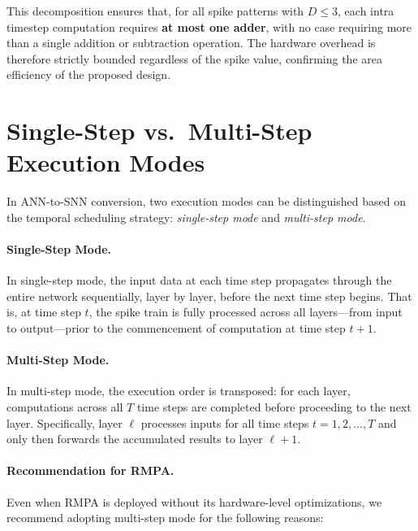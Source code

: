 This decomposition ensures that, for all spike patterns with $D \leq 3$, each intra timestep computation requires \textbf{at most one adder}, with no case requiring more than a single addition or subtraction operation. The hardware overhead is therefore strictly bounded regardless of the spike value, confirming the area efficiency of the proposed design.

\section{Single-Step vs.\ Multi-Step Execution Modes}

In ANN-to-SNN conversion, two execution modes can be distinguished based on the 
temporal scheduling strategy: \textit{single-step mode} and \textit{multi-step mode}.

\paragraph{Single-Step Mode.}
In single-step mode, the input data at each time step propagates through the entire 
network sequentially, layer by layer, before the next time step begins. That is, at 
time step $t$, the spike train is fully processed across all layers---from input to 
output---prior to the commencement of computation at time step $t+1$.

\paragraph{Multi-Step Mode.}
In multi-step mode, the execution order is transposed: for each layer, computations 
across all $T$ time steps are completed before proceeding to the next layer. 
Specifically, layer $\ell$ processes inputs for all time steps $t = 1, 2, \ldots, T$ 
and only then forwards the accumulated results to layer $\ell+1$.

\paragraph{Recommendation for RMPA.}
Even when RMPA is deployed without its hardware-level optimizations, we recommend 
adopting multi-step mode for the following reasons:

